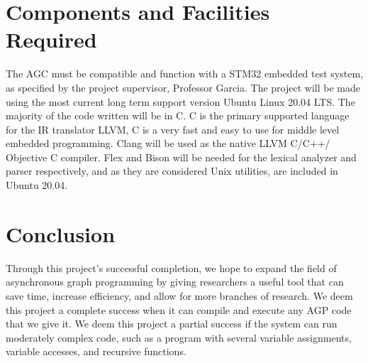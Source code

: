 \documentclass[11pt]{article}
\begin{document}
\section{Components and Facilities Required}

The AGC must be compatible and function with a STM32 embedded test system, as specified by the project supervisor, Professor Garcia. The project will be made using the most current long term support version Ubuntu Linux 20.04 LTS. The majority of the code written will be in C. C is the primary supported language for the IR translator LLVM, C is a very fast and easy to use for middle level embedded programming. Clang will be used as the native LLVM C/C++/ Objective C compiler. Flex and Bison will be needed for the lexical analyzer and parser respectively, and as they are considered Unix utilities, are included in Ubuntu 20.04.



\section{Conclusion}

Through this project’s successful completion, we hope to expand the field of asynchronous graph programming by giving researchers a useful tool that can save time, increase efficiency, and allow for more branches of research. We deem this project a complete success when it can compile and execute any AGP code that we give it. We deem this project a partial success if the system can run moderately complex code, such as a program with several variable assignments, variable accesses, and recursive functions. 

\pagebreak
\end{document}
